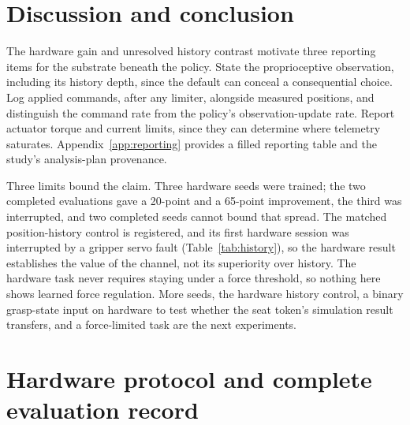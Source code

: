\documentclass{article}
\begin{document}
\section{Discussion and conclusion}
The hardware gain and unresolved history contrast motivate three reporting
items for the substrate beneath the policy.
State the proprioceptive observation, including its history depth, since the
default can conceal a consequential choice. Log applied commands, after any
limiter, alongside measured positions, and distinguish the command rate from
the policy's observation-update rate. Report actuator torque and current
limits, since they can determine where telemetry saturates. Appendix~\ref{app:reporting}
provides a filled reporting table and the study's analysis-plan provenance.

Three limits bound the claim. Three hardware seeds were trained; the two
completed evaluations gave a 20-point and a 65-point improvement, the third
was interrupted, and two completed seeds cannot bound that spread. The matched position-history control is registered, and its first hardware
session was interrupted by a gripper servo fault (Table~\ref{tab:history}), so the hardware result establishes the
value of the channel, not its superiority over history.
The hardware task never requires staying under a force threshold, so nothing
here shows learned force regulation. More seeds, the hardware history
control, a binary grasp-state input on hardware to test whether the seat
token's simulation result transfers, and a force-limited task are the next
experiments.

\clearpage

\clearpage
\appendix

\section{Hardware protocol and complete evaluation record}
\label{app:protocol}
\begin{table}[h]
\centering
\small
\caption{Full hardware evaluation record: success counts with Wilson 95\%
intervals in percentage points, discordant and concordant pair counts, exact
McNemar $p$ per seed, and the stratified exact test over the completed seeds.
The interrupted seed has six recorded pairs, with 0/6 placements for each
policy; its planned budget was 20 pairs. No confirmatory test is assigned to
the incomplete comparison.}
\resizebox{\linewidth}{!}{}
\end{table}
\end{document}
